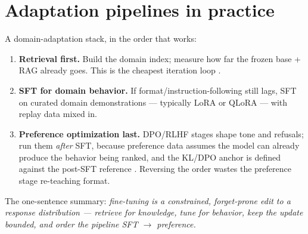 \documentclass[11pt]{article}
\begin{document}
\section{Adaptation pipelines in practice}
A domain-adaptation stack, in the order that works:
\begin{enumerate}[noitemsep]
  \item \textbf{Retrieval first.} Build the domain index; measure how far the frozen base + RAG already goes. This is the cheapest iteration loop \cite{lewis2020retrieval,ovadia2024fine}.
  \item \textbf{SFT for domain behavior.} If format/instruction-following still lags, SFT on curated domain demonstrations --- typically LoRA \cite{hu2022lora} or QLoRA \cite{dettmers2023qlora} --- with replay data mixed in.
  \item \textbf{Preference optimization last.} DPO/RLHF stages shape tone and refusals; run them \emph{after} SFT, because preference data assumes the model can already produce the behavior being ranked, and the KL/DPO anchor is defined against the post-SFT reference \cite{rafailov2023direct,ouyang2022training}. Reversing the order wastes the preference stage re-teaching format.
\end{enumerate}
The one-sentence summary: \emph{fine-tuning is a constrained, forget-prone edit to a response distribution --- retrieve for knowledge, tune for behavior, keep the update bounded, and order the pipeline SFT $\to$ preference.}



\end{document}
